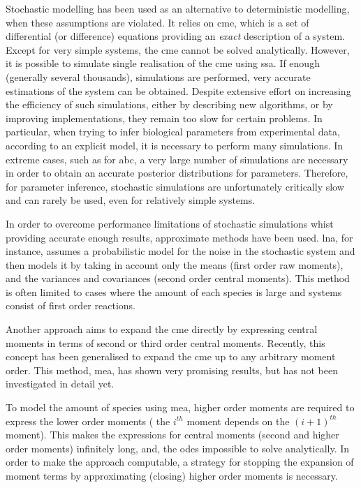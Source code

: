 Stochastic modelling has been used as an alternative to deterministic modelling, when these assumptions are violated.
It relies on \gls{cme}, which is a set of differential (or difference) equations providing an \emph{exact} description of a system\cite{kampen_stochastic_2011}.
Except for very simple systems, the \gls{cme} cannot be solved analytically.
However, it is possible to simulate single realisation of the \gls{cme} using \gls{ssa}.
If enough (generally several thousands), simulations are performed, very accurate estimations of the system can be obtained.
Despite extensive effort on increasing the efficiency of such simulations, either by describing new algorithms, or by improving implementations\cite{niemi_efficient_2011,dittamo_optimized_2009,komarov_accelerating_2012},
they remain too slow for certain problems.
In particular, when trying to infer biological parameters from experimental data, according to an explicit model,
it is necessary to perform many simulations.
In extreme cases, such as for \gls{abc}\cite{toni_approximate_2009}, a very large number of simulations are necessary in order to obtain an 
accurate posterior distributions for parameters.
Therefore, for parameter inference, stochastic simulations are unfortunately critically slow and can rarely be used, even for relatively simple systems.

In order to overcome performance limitations of stochastic simulations whist providing accurate enough results, approximate methods have been used.
\Acrlong{lna}, for instance, 
assumes a probabilistic model for the noise in the stochastic system and then models it by taking in account only the means (first order raw moments), and the variances and covariances (second order central moments)\cite{komorowski_bayesian_2009}.
This method is often limited to cases where the amount of each species is large and systems consist of first order reactions\cite{ale_general_2013}.

Another approach aims to expand the \gls{cme} directly by expressing central moments in terms of second or third order central moments\cite{gillespie_moment-closure_2009, gomez-uribe_mass_2007}.
Recently, this concept has been generalised to expand the \gls{cme} up to any arbitrary moment order\cite{ale_general_2013}.
This method, \gls{mea}, has shown very promising results, but has not been investigated in detail yet.

To model the amount of species using \gls{mea}, higher order moments are required to express the lower order moments
(\ie{} the $i^{th}$ moment depends on the $(i+1)^{th}$ moment).
This makes the expressions for central moments (second and higher order moments) infinitely long, and, the \glspl{ode} impossible to solve analytically. 
In order to make the approach computable, a strategy for stopping the
expansion of moment terms by approximating (closing) higher order moments is necessary.

